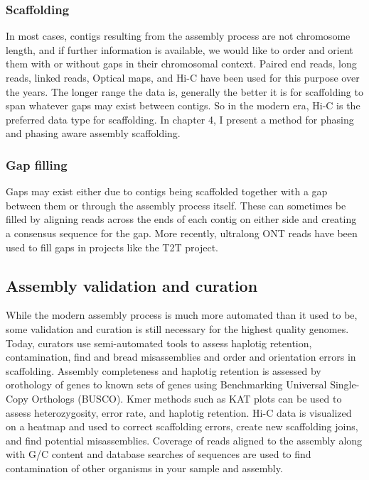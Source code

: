 \subsubsection{Scaffolding}

\par{
In most cases, contigs resulting from the assembly process are not chromosome length, and if further information is available, we would like to order and orient them with or without gaps in their chromosomal context. Paired end reads, long reads, linked reads, Optical maps, and Hi-C have been used for this purpose over the years\cite{scaffoldingreview}\cite{scaff10x}\cite{SALSA}. The longer range the data is, generally the better it is for scaffolding to span whatever gaps may exist between contigs. So in the modern era, Hi-C is the preferred data type for scaffolding. In chapter 4, I present a method for phasing and phasing aware assembly scaffolding.
}
\subsubsection{Gap filling}

\par{
Gaps may exist either due to contigs being scaffolded together with a gap between them or through the assembly process itself. These can sometimes be filled by aligning reads across the ends of each contig on either side and creating a consensus sequence for the gap\cite{pbjelly}. More recently, ultralong ONT reads have been used to fill gaps in projects like the T2T project\cite{ultralong1}\cite{ultralong2}.
}

\subsection{Assembly validation and curation}

\par{
While the modern assembly process is much more automated than it used to be, some validation and curation is still necessary for the highest quality genomes. Today, curators use semi-automated tools to assess haplotig retention, contamination, find and bread misassemblies and order and orientation errors in scaffolding\cite{curation2}. Assembly completeness and haplotig retention is assessed by orothology of genes to known sets of genes using Benchmarking Universal Single-Copy Orthologs (BUSCO)\cite{BUSCO}. Kmer methods such as KAT plots\cite{KAT} can be used to assess heterozygosity, error rate, and haplotig retention. Hi-C data is visualized on a heatmap and used to correct scaffolding errors, create new scaffolding joins, and find potential misassemblies\cite{juicer}\cite{higlass}\cite{juicebox}. Coverage of reads aligned to the assembly along with G/C content and database searches of sequences are used to find contamination of other organisms in your sample and assembly\cite{blobtools}\cite{blobtoolkit}.
}

